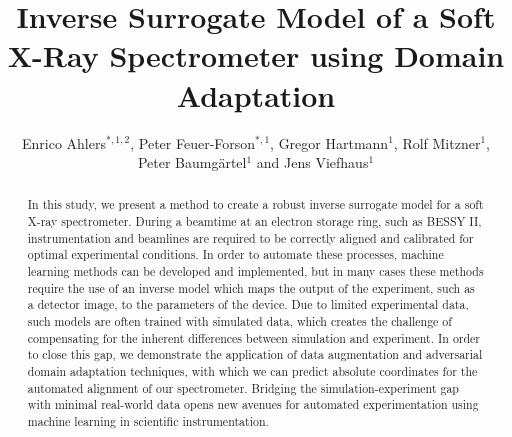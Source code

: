 \documentclass{iopconfser}
\begin{document}
\title{Inverse Surrogate Model of a Soft X-Ray Spectrometer using Domain Adaptation}

\author{Enrico Ahlers$^{*,1,2}$, Peter Feuer-Forson$^{*,1}$, Gregor Hartmann$^{1}$, Rolf Mitzner$^{1}$, Peter Baumgärtel$^{1}$ and Jens Viefhaus$^{1}$}

\vspace{20pt}
\vspace{20pt}
\vspace{10pt}
\begin{abstract}
In this study, we present a method to create a robust inverse surrogate model for a soft X-ray spectrometer. During a beamtime at an electron storage ring, such as BESSY II, instrumentation and beamlines are required to be correctly aligned and calibrated for optimal experimental conditions. In order to automate these processes, machine learning methods can be developed and implemented, but in many cases these methods require the use of an inverse model which maps the output of the experiment, such as a detector image, to the parameters of the device. Due to limited experimental data, such models are often trained with simulated data, which creates the challenge of compensating for the inherent differences between simulation and experiment. In order to close this gap, we demonstrate the application of data augmentation and adversarial domain adaptation techniques, with which we can predict absolute coordinates for the automated alignment of our spectrometer. Bridging the simulation-experiment gap with minimal real-world data opens new avenues for automated experimentation using machine learning in scientific instrumentation.
\end{abstract}
\end{document}
